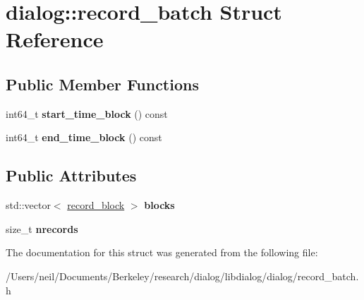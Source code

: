 \hypertarget{structdialog_1_1record__batch}{}\section{dialog\+:\+:record\+\_\+batch Struct Reference}
\label{structdialog_1_1record__batch}
\subsection*{Public Member Functions}
\begin{DoxyCompactItemize}
\item 
\mbox{\label{structdialog_1_1record__batch_a888a26ec19e97a8c95f1d63389b42347}} 
int64\+\_\+t {\bfseries start\+\_\+time\+\_\+block} () const
\item 
\mbox{\label{structdialog_1_1record__batch_a0b93d4224a917916a1df16f9ccad91fd}} 
int64\+\_\+t {\bfseries end\+\_\+time\+\_\+block} () const
\end{DoxyCompactItemize}
\subsection*{Public Attributes}
\begin{DoxyCompactItemize}
\item 
\mbox{\label{structdialog_1_1record__batch_ae67753e518bfa1d6dc617f9a922c6052}} 
std\+::vector$<$ \hyperlink{structdialog_1_1record__block}{record\+\_\+block} $>$ {\bfseries blocks}
\item 
\mbox{\label{structdialog_1_1record__batch_a8aa53a8f0e28820860364f31775cc7a8}} 
size\+\_\+t {\bfseries nrecords}
\end{DoxyCompactItemize}


The documentation for this struct was generated from the following file\+:\begin{DoxyCompactItemize}
\item 
/\+Users/neil/\+Documents/\+Berkeley/research/dialog/libdialog/dialog/record\+\_\+batch.\+h\end{DoxyCompactItemize}
